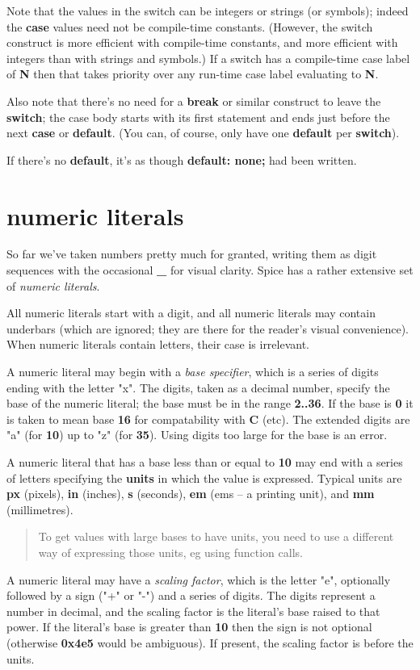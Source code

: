 \documentclass{report}
\begin{document}
Note that the values in the switch can be integers or strings (or symbols);
indeed the {\bf case} values need not be compile-time constants. (However, the
switch construct is more efficient with compile-time constants, and more
efficient with integers than with strings and symbols.) If a switch has a
compile-time case label of {\bf N} then that takes priority over any run-time case
label evaluating to {\bf N}.

Also note that there's no need for a {\bf break} or similar construct to leave the
{\bf switch}; the case body starts with its first statement and ends just before
the next {\bf case} or {\bf default}. (You can, of course, only have one
{\bf default} per {\bf switch}).

If there's no {\bf default}, it's as though {\bf default: none;} had been written.
\chapter{numeric literals}


So far we've taken numbers pretty much for granted, writing them as digit
sequences with the occasional {\bf \_} for visual clarity. Spice has a rather
extensive set of {\em numeric literals}.

All numeric literals start with a digit, and all numeric literals may
contain underbars (which are ignored; they are there for the reader's visual
convenience). When numeric literals contain letters, their case is
irrelevant.

A numeric literal may begin with a {\em base specifier}, which is a series of
digits ending with the letter "x". The digits, taken as a decimal number,
specify the base of the numeric literal; the base must be in the range
{\bf 2..36}. If the base is {\bf 0} it is taken to mean base {\bf 16} for compatability
with {\bf C} (etc). The extended digits are "a" (for {\bf 10}) up to "z" (for {\bf 35}).
Using digits too large for the base is an error.

A numeric literal that has a base less than or equal to {\bf 10} may end with
a series of letters specifying the {\bf units} in which the value is expressed.
Typical units are {\bf px} (pixels), {\bf in} (inches), {\bf s} (seconds), {\bf em} (ems -- a
printing unit), and {\bf mm} (millimetres).

\begin{quote}To get values with large bases to have units, you need to use a different
way of expressing those units, eg using function calls.
\end{quote}A numeric literal may have a {\em scaling factor}, which is the letter "e",
optionally followed by a sign ("+" or "-") and a series of digits. The digits
represent a number in decimal, and the scaling factor is the literal's base
raised to that power. If the literal's base is greater than {\bf 10} then the sign
is not optional (otherwise {\bf 0x4e5} would be ambiguous). If present, the
scaling factor is before the units.
\end{document}
